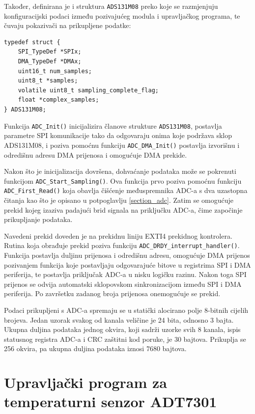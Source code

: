 Također, definirana je i struktura \texttt{ADS131M08} preko koje se razmjenjuju konfiguracijski podaci između pozivajućeg modula i upravljačkog programa, te čuvaju pokazivači na prikupljene podatke:

\begin{lstlisting}[caption={Definicija tipa \texttt{ADS131M08}}]
typedef struct {
    SPI_TypeDef *SPIx;
    DMA_TypeDef *DMAx;
    uint16_t num_samples;
    uint8_t *samples;
    volatile uint8_t sampling_complete_flag;
    float *complex_samples;
} ADS131M08;
\end{lstlisting}

Funkcija \texttt{ADC\_Init()} inicijalizira članove strukture \texttt{ADS131M08}, postavlja parametre SPI komunikacije tako da odgovaraju onima koje podržava sklop ADS131M08, i poziva pomoćnu funkciju \texttt{ADC\_DMA\_Init()} postavlja izvorišnu i odredišnu adresu DMA prijenosa i omogućuje DMA prekide.

Nakon što je inicijalizacija dovršena, dohvaćanje podataka može se pokrenuti funkcijom \texttt{ADC\_Start\_Sampling()}. Ova funkcija prvo poziva pomoćnu funkciju \texttt{ADC\_First\_Read()} koja obavlja čišćenje međuspremnika ADC-a s dva uzastopna čitanja kao što je opisano u potpoglavlju \ref{section_adc}. Zatim se omogućuje prekid kojeg izaziva padajući brid signala na priključku  ADC-a, čime započinje prikupljanje podataka.

Navedeni prekid doveden je na prekidnu liniju EXTI4 prekidnog kontrolera. Rutina koja obrađuje prekid poziva funkciju \texttt{ADC\_DRDY\_interrupt\_handler()}. Funkcija postavlja duljinu prijenosa i odredišnu adresu, omogućuje DMA prijenos pozivanjem funkcija koje postavljaju odgovarajuće bitove u registrima SPI i DMA periferija, te postavlja priključak  ADC-a u nisku logičku razinu. Nakon toga SPI prijenos se odvija automatski sklopovskom sinkronizacijom između SPI i DMA periferija. Po završetku zadanog broja prijenosa onemogućuje se  prekid.

Podaci prikupljeni s ADC-a spremaju se u statički alocirano polje 8-bitnih cijelih brojeva. Jedan uzorak svakog od kanala veličine je 24 bita, odnosno 3 bajta. Ukupna duljina podataka jednog okvira, koji sadrži uzorke svih 8 kanala, ispis statusnog registra ADC-a i CRC zaštitni kod poruke, je 30 bajtova. Prikuplja se 256 okvira, pa ukupna duljina podataka iznosi 7680 bajtova.

\section{Upravljački program za temperaturni senzor ADT7301}

